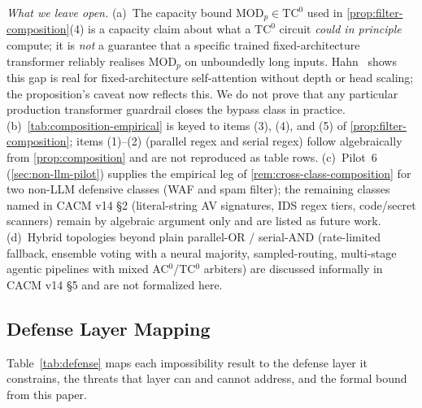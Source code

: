 \documentclass[letterpaper,twocolumn,10pt]{article}
\theoremstyle{definition}
\theoremstyle{remark}
\begin{document}
\emph{What we leave open.} (a)~The capacity bound $\mathrm{MOD}_p \in
\mathrm{TC}^0$ used in \cref{prop:filter-composition}(4) is a capacity
claim about what a $\mathrm{TC}^0$ circuit \emph{could in principle}
compute; it is \emph{not} a guarantee that a specific trained
fixed-architecture transformer reliably realises $\mathrm{MOD}_p$ on
unboundedly long inputs. Hahn~\cite{hahn2020limitations} shows this gap is
real for fixed-architecture self-attention without depth or head scaling;
the proposition's caveat now reflects this. We do not prove that any
particular production transformer guardrail closes the bypass class in
practice. (b)~\cref{tab:composition-empirical} is keyed to items (3), (4),
and (5) of \cref{prop:filter-composition}; items (1)--(2) (parallel
regex and serial regex) follow algebraically from
\cref{prop:composition} and are not reproduced as table rows. (c)~Pilot~6
(\cref{sec:non-llm-pilot}) supplies the empirical leg of
\cref{rem:cross-class-composition} for two non-LLM defensive classes (WAF
and spam filter); the remaining classes named in CACM v14 \S2
(literal-string AV signatures, IDS regex tiers, code/secret scanners)
remain by algebraic argument only and are listed as future work.
(d)~Hybrid topologies beyond plain parallel-OR / serial-AND
(rate-limited fallback, ensemble voting with a neural majority,
sampled-routing, multi-stage agentic pipelines with mixed AC$^0$/TC$^0$
arbiters) are discussed informally in CACM v14 \S5 and are not formalized
here.

\subsection{Defense Layer Mapping}\label{sec:defense-table}

Table~\ref{tab:defense} maps each impossibility result to the defense layer it
constrains, the threats that layer can and cannot address, and the formal bound
from this paper.
\end{document}
